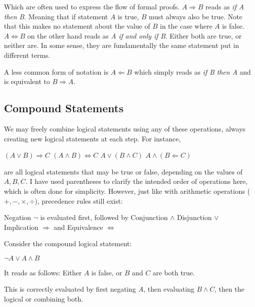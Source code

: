 Which are often used to express the flow of formal proofs.
\(A \Rightarrow B\) reads as \emph{if A then B}. Meaning that if statement \(A\)
is true, \(B\) must always also be true. Note that this makes no statement
about the value of \(B\) in the case where \(A\) is false.
\(A \Leftrightarrow B\) on the other hand reads as \emph{A if and only if B}.
Either both are true, or neither are. In some sense, they are fundamentally the
same statement put in different terms.

A less common form of notation is \(A \Leftarrow B\) which simply reads as
\emph{if B then A} and is equivalent to \(B \Rightarrow A\).

\subsection{Compound Statements}
We may freely combine logical statements using any of these operations, always
creating new logical statements at each step. For instance,
\begin{example}
  \((A \lor B) \Rightarrow C\)
  \hfill
  \((A \land B) \Leftrightarrow C\)
  \hfill
  \(A \lor (B \land C)\)
  \hfill
  \(A \land (B \Leftarrow C)\)
\end{example}

are all logical statements that may be true or false, depending on the values of
\(A, B, C\).
I have used parentheses to clarify the intended order of operations here, which
is often done for simplicity. However, just like with arithmetic operations
(\(+, -, \times, \div\)), precedence rules still exist:
\begin{itemize}
  \ii{} Negation \(\neg\) is evaluated first, followed by
  \ii{} Conjunction \(\land\)
  \ii{} Disjunction \(\lor\)
  \ii{} Implication \(\Rightarrow\) and
  \ii{} Equivalence \(\Leftrightarrow\)
\end{itemize}

\begin{example}
  Consider the compound logical statement:\\
  \begin{center}
    \(\neg A \lor A \land B\)
  \end{center}
  It reads as follows: Either \(A\) is false, or \(B\) and \(C\) are both true.

  This is correctly evaluated by first negating \(A\), then evaluating
  \(B \land C\), then the logical or combining both.
\end{example}

